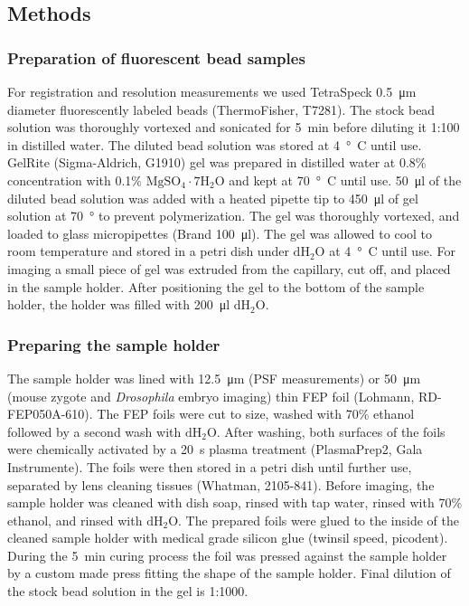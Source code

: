   \subsection{Methods}

  \label{sec:methods2}

  \subsubsection{Preparation of fluorescent bead samples}
    \label{sec:beads}
    For registration and resolution measurements we used TetraSpeck \SI{0.5}{\micro m} diameter fluorescently labeled beads (ThermoFisher, T7281). The stock bead solution was thoroughly vortexed and sonicated for \SI{5}{min} before diluting it 1:100 in distilled water. The diluted bead solution was stored at \SI{4}{\degree C} until use. GelRite (Sigma-Aldrich, G1910) gel was prepared in distilled water at 0.8\% concentration with 0.1\% $\mathrm{MgSO_4\cdot 7 H_2O}$ and kept at \SI{70}{\degree C} until use. \SI{50}{\micro l} of the diluted bead solution was added with a heated pipette tip to \SI{450}{\micro l} of gel solution at \SI{70}{\degree} to prevent  polymerization. The gel was thoroughly vortexed, and loaded to glass micropipettes (Brand \SI{100}{\micro l}). The gel was allowed to cool to room temperature and stored in a petri dish under $\mathrm{dH_2O}$ at \SI{4}{\degree C} until use. For imaging a small piece of gel was extruded from the capillary, cut off, and placed in the sample holder. After positioning the gel to the bottom of the sample holder, the holder was filled with \SI{200}{\micro l} $\mathrm{dH_2O}$.

  \subsubsection{Preparing the sample holder}
    The sample holder was lined with \SI{12.5}{\micro m} (PSF measurements) or \SI{50}{\micro m} (mouse zygote and \textit{Drosophila} embryo imaging) thin FEP foil (Lohmann, RD-FEP050A-610). The FEP foils were cut to size, washed with 70\% ethanol followed by a second wash with $\mathrm{dH_2O}$. After washing, both surfaces of the foils were chemically activated by a \SI{20}{s} plasma treatment (PlasmaPrep2, Gala Instrumente). The foils were then stored in a petri dish until further use, separated by lens cleaning tissues (Whatman, 2105-841). Before imaging, the sample holder was cleaned with dish soap, rinsed with tap water, rinsed with 70\% ethanol, and rinsed with $\mathrm{dH_2O}$. The prepared foils were glued to the inside of the cleaned sample holder with medical grade silicon glue (twinsil speed, picodent). During the \SI{5}{min} curing process the foil was pressed against the sample holder by a custom made press fitting the shape of the sample holder. Final dilution of the stock bead solution in the gel is 1:1000.

